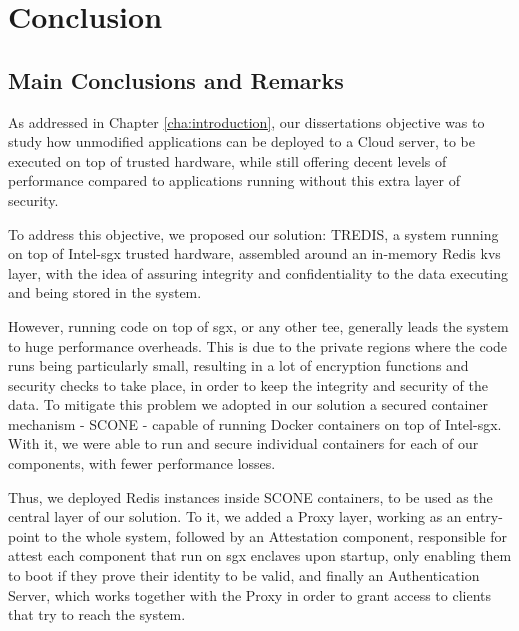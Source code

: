 \chapter{Conclusion}
\label{cha:conclusion}

\section{Main Conclusions and Remarks}

As addressed in Chapter \ref{cha:introduction}, our dissertations objective was to study how unmodified applications can be deployed to a Cloud server, to be executed on top of trusted hardware, while still offering decent levels of performance compared to applications running without this extra layer of security.

To address this objective, we proposed our solution: TREDIS, a system running on top of Intel-\gls{sgx} trusted hardware, assembled around an in-memory Redis \gls{kvs} layer, with the idea of assuring integrity and confidentiality to the data executing and being stored in the system.

However, running code on top of \gls{sgx}, or any other \gls{tee}, generally leads the system to huge performance overheads. This is due to the private regions where the code runs being particularly small, resulting in a lot of encryption functions and security checks to take place, in order to keep the integrity and security of the data. To mitigate this problem we adopted in our solution a secured container mechanism - SCONE - capable of running Docker containers on top of Intel-\gls{sgx}. With it, we were able to run and secure individual containers for each of our components, with fewer performance losses.

Thus, we deployed Redis instances inside SCONE containers, to be used as the central layer of our solution. To it, we added a Proxy layer, working as an entry-point to the whole system, followed by an Attestation component, responsible for attest each component that run on \gls{sgx} enclaves upon startup, only enabling them to boot if they prove their identity to be valid, and finally an Authentication Server, which works together with the Proxy in order to grant access to clients that try to reach the system.

